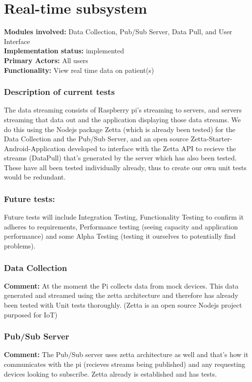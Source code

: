 \documentclass[12pt]{article}
\begin{document}
{	\pagebreak

	\section{Real-time subsystem}
	\textbf{Modules involved:} Data Collection,  Pub/Sub Server, Data Pull, and User Interface \\
	\textbf{Implementation status:} implemented \\
	\textbf{Primary Actors:} All users \\
	\textbf{Functionality:} View real time data on patient(s)\\
	\subsubsection{Description of current tests}
	The data streaming consists of Raspberry pi's streaming to servers, and servers streaming that data out and the application displaying those data streams. We do this using the Nodejs package Zetta (which is already been tested) for the Data Collection and the Pub/Sub Server, and an open source Zetta-Starter-Android-Application developed to interface with the Zetta API to recieve the streams (DataPull) that's generated by the server which has also been tested. These have all been tested individually already, thus to create our own unit tests would be redundant.
	\subsubsection{Future tests:}
	Future tests will include Integration Testing, Functionality Testing to confirm it adheres to requirements, Performance testing (seeing capacity and application performance) and some Alpha Testing (testing it ourselves to potentially find problems).
	\subsubsection{Data Collection}
	\textbf{Comment:} At the moment the Pi collects data from mock devices. This data generated and streamed using the zetta architecture and therefore has already been tested with Unit tests thoroughly. (Zetta is an open source Nodejs project purposed for IoT)
	\subsubsection{Pub/Sub Server}
	\textbf{Comment:} The Pub/Sub server uses zetta architecture as well and that's how it communicates with the pi (recieves streams being published) and any requesting devices looking to subscribe. Zetta already is established and has tests.
}
\end{document}
